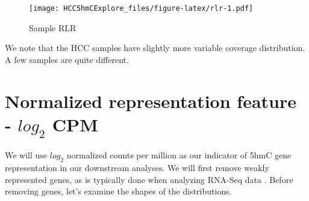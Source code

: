 \documentclass[
]{book}
\newenvironment{Shaded}{\begin{snugshade}}{\end{snugshade}}
\newcommand{\CommentTok}[1]{\textcolor[rgb]{0.56,0.35,0.01}{\textit{#1}}}
\newcommand{\ControlFlowTok}[1]{\textcolor[rgb]{0.13,0.29,0.53}{\textbf{#1}}}
\newcommand{\DataTypeTok}[1]{\textcolor[rgb]{0.13,0.29,0.53}{#1}}
\newcommand{\DecValTok}[1]{\textcolor[rgb]{0.00,0.00,0.81}{#1}}
\newcommand{\FloatTok}[1]{\textcolor[rgb]{0.00,0.00,0.81}{#1}}
\newcommand{\KeywordTok}[1]{\textcolor[rgb]{0.13,0.29,0.53}{\textbf{#1}}}
\newcommand{\NormalTok}[1]{#1}
\newcommand{\OperatorTok}[1]{\textcolor[rgb]{0.81,0.36,0.00}{\textbf{#1}}}
\newcommand{\StringTok}[1]{\textcolor[rgb]{0.31,0.60,0.02}{#1}}
\begin{document}
\begin{figure}
\centering
\texttt{[image: HCC5hmCExplore\_files/figure-latex/rlr-1.pdf]}
\caption{\label{fig:rlr}Sample RLR}
\end{figure}

We note that the HCC samples have slightly more variable coverage distribution.
A few samples are quite different.

\hypertarget{normalized-representation-feature---log_2-cpm}{%
\section{\texorpdfstring{Normalized representation feature - \(log_2\) CPM}{Normalized representation feature - log\_2 CPM}}\label{normalized-representation-feature---log_2-cpm}}

We will use \(log_2\) normalized counts per million as our indicator
of 5hmC gene representation in our downstream analyses.
We will first remove weakly represented genes, as is typically done when
analyzing RNA-Seq data \citep{Law:2018aa}. Before removing genes, let's examine the
shapes of the distributions.

\begin{Shaded}
\end{Shaded}
\end{document}
